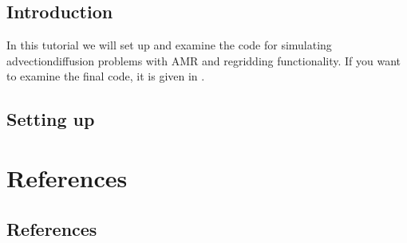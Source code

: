\documentclass[letterpaper,10pt,english]{sphinxmanual}
\begin{document}
\section{Introduction}
\label{\detokenize{Tutorial:introduction}}\label{\detokenize{Tutorial:chap-adrtutorial}}\label{\detokenize{Tutorial::doc}}
In this tutorial we will set up and examine the code for simulating advection\sphinxhyphen{}diffusion problems with AMR and regridding functionality.
If you want to examine the final code, it is given in .


\section{Setting up }
\label{\detokenize{Tutorial:setting-up-time-stepper}}

\chapter{References}
\label{\detokenize{index:references}}\label{\detokenize{index:chap-references}}

\section{References}
\label{\detokenize{References:references}}\label{\detokenize{References::doc}}
\end{document}

